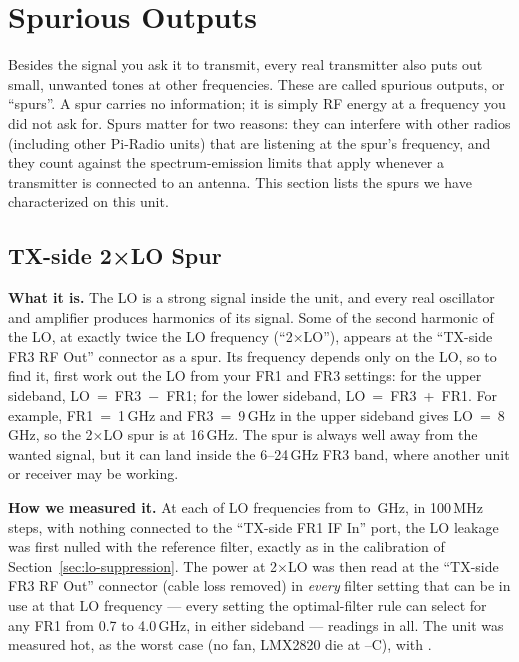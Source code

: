 \clearpage
\section{Spurious Outputs}
\label{sec:spurious-outputs}
\raggedbottom%

Besides the signal you ask it to transmit, every real transmitter also puts out small, unwanted tones at other
frequencies. These are called spurious outputs, or ``spurs''. A spur carries no information; it is simply RF energy
at a frequency you did not ask for. Spurs matter for two reasons: they can interfere with other radios (including
other Pi-Radio units) that are listening at the spur's frequency, and they count against the spectrum-emission
limits that apply whenever a transmitter is connected to an antenna. This section lists the spurs we have
characterized on this unit.

\subsection{TX-side 2×LO Spur}
\label{sec:spur-tx-2lo}

\textbf{What it is.} The LO is a strong signal inside the unit, and every real oscillator and amplifier produces
harmonics of its signal. Some of the second harmonic of
the LO, at exactly twice the LO frequency (``2×LO''), appears at the ``TX-side FR3 RF Out'' connector as a spur.
Its frequency depends only on the LO, so to find it, first work out the LO from your FR1 and FR3 settings: for the
upper sideband, LO~=~FR3~$-$~FR1; for the lower sideband, LO~=~FR3~+~FR1. For example, FR1~=~1\,GHz and
FR3~=~9\,GHz in the upper sideband gives LO~=~8\,GHz, so the 2×LO spur is at 16\,GHz. The spur is always well
away from the wanted signal, but it can land inside the 6--24\,GHz FR3 band, where another unit or receiver may be
working.

\textbf{How we measured it.} At each of \twoLoLoCount{} LO frequencies from \twoLoLoMin{} to \twoLoLoMax\,GHz, in 100\,MHz steps, with nothing connected to the ``TX-side FR1 IF In'' port, the LO leakage was first nulled with the reference filter, exactly as in the calibration of Section~\ref{sec:lo-suppression}. The power at 2×LO was then read at the ``TX-side FR3 RF Out'' connector (cable loss removed) in \emph{every} filter setting that can be in use at that LO frequency --- every setting the optimal-filter rule can select for any FR1 from 0.7 to 4.0\,GHz, in either sideband --- \twoLoReadCount{} readings in all. The unit was measured hot, as the worst case (no fan, LMX2820 die at \twoLoMinC--\twoLoMaxC\textdegree C), with \lmxDriveRule.

